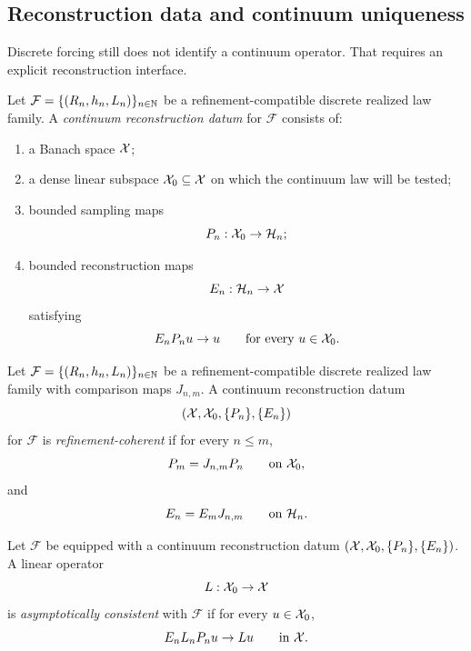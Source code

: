 \subsection{Reconstruction data and continuum uniqueness}

Discrete forcing still does not identify a continuum operator. That requires an
explicit reconstruction interface.

\begin{definition}
\label{def:continuum-reconstruction-datum}
Let $\mathcal F=\{(R_n,h_n,L_n)\}_{n\in\mathbb{N}}$ be a refinement-compatible
discrete realized law family. A \emph{continuum reconstruction datum} for
$\mathcal F$ consists of:
\begin{enumerate}[label=(\roman*), leftmargin=2em, itemsep=0.2em]
\item a Banach space $\mathcal{X}$;
\item a dense linear subspace $\mathcal{X}_0\subseteq \mathcal{X}$ on which the continuum law
      will be tested;
\item bounded sampling maps
      \[
      P_n:\mathcal{X}_0\to \mathcal{H}_n;
      \]
\item bounded reconstruction maps
      \[
      E_n:\mathcal{H}_n\to \mathcal{X}
      \]
      satisfying
      \[
      E_nP_nu\to u
      \qquad\text{for every }u\in\mathcal{X}_0.
      \]
\end{enumerate}
\end{definition}

\begin{definition}
\label{def:refinement-coherent-reconstruction}
Let \(\mathcal F=\{(R_n,h_n,L_n)\}_{n\in\mathbb{N}}\) be a
refinement-compatible discrete realized law family with comparison maps
\(J_{n,m}\). A continuum reconstruction datum
\[
(\mathcal{X},\mathcal{X}_0,\{P_n\},\{E_n\})
\]
for \(\mathcal F\) is \emph{refinement-coherent} if for every \(n\le m\),
\[
P_m = J_{n,m}P_n
\qquad\text{on }\mathcal{X}_0,
\]
and
\[
E_n = E_m J_{n,m}
\qquad\text{on }\mathcal{H}_n.
\]
\end{definition}

\begin{definition}
\label{def:asymptotic-consistency}
Let $\mathcal F$ be equipped with a continuum reconstruction datum
$(\mathcal{X},\mathcal{X}_0,\{P_n\},\{E_n\})$. A linear operator
\[
L:\mathcal{X}_0\to \mathcal{X}
\]
is \emph{asymptotically consistent} with $\mathcal F$ if for every
$u\in\mathcal{X}_0$,
\[
E_nL_nP_nu\to Lu
\qquad\text{in }\mathcal{X}.
\]
\end{definition}

